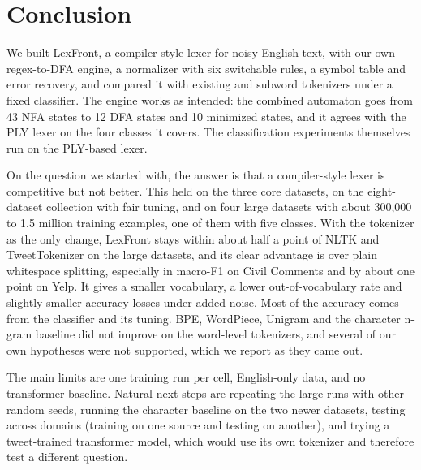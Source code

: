 \documentclass[journal,a4paper]{IEEEtran}
\begin{document}
\section{Conclusion}\label{sec:6}
 We built LexFront, a compiler-style lexer for noisy English text, with our own regex-to-DFA engine, a normalizer with six switchable rules, a symbol table and error recovery, and compared it with existing and subword tokenizers under a fixed classifier. The engine works as intended: the combined automaton goes from 43 NFA states to 12 DFA states and 10 minimized states, and it agrees with the PLY lexer on the four classes it covers. The classification experiments themselves run on the PLY-based lexer.

 On the question we started with, the answer is that a compiler-style lexer is competitive but not better. This held on the three core datasets, on the eight-dataset collection with fair tuning, and on four large datasets with about 300,000 to 1.5 million training examples, one of them with five classes. With the tokenizer as the only change, LexFront stays within about half a point of NLTK and TweetTokenizer on the large datasets, and its clear advantage is over plain whitespace splitting, especially in macro-F1 on Civil Comments and by about one point on Yelp. It gives a smaller vocabulary, a lower out-of-vocabulary rate and slightly smaller accuracy losses under added noise. Most of the accuracy comes from the classifier and its tuning. BPE, WordPiece, Unigram and the character n-gram baseline did not improve on the word-level tokenizers, and several of our own hypotheses were not supported, which we report as they came out.

 The main limits are one training run per cell, English-only data, and no transformer baseline. Natural next steps are repeating the large runs with other random seeds, running the character baseline on the two newer datasets, testing across domains (training on one source and testing on another), and trying a tweet-trained transformer model, which would use its own tokenizer and therefore test a different question.
\end{document}
